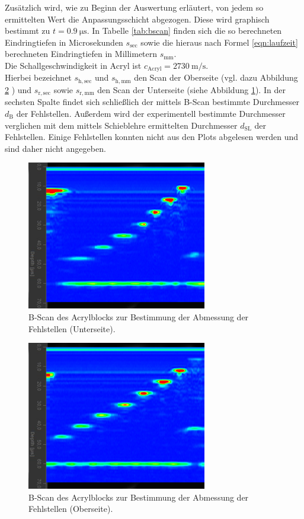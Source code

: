 Zusätzlich wird, wie zu Beginn der Auswertung erläutert, von jedem so ermittelten Wert die Anpassungsschicht abgezogen. Diese wird graphisch bestimmt zu $t=\SI{0.9}{\micro\second}$.
In Tabelle \ref{tab:bscan} finden sich die so berechneten Eindringtiefen in Microsekunden $s_\mathrm{sec}$ sowie die hieraus nach Formel \eqref{eqn:laufzeit} berechneten Eindringtiefen in Millimetern $s_\mathrm{mm}$.\\
Die Schallgeschwindigkeit in Acryl ist $c_\mathrm{Acryl}=\SI{2730}{\meter\per\second}$.\\
Hierbei bezeichnet $s_\mathrm{h,sec}$ und $s_\mathrm{h,mm}$ den Scan der Oberseite (vgl. dazu Abbildung \ref{fig:b1} ) und $s_\mathrm{r,sec}$ sowie $s_\mathrm{r,mm}$ den Scan der Unterseite (siehe Abbildung \ref{fig:b2}).
In der sechsten Spalte findet sich schließlich der mittels B-Scan bestimmte Durchmesser $d_\mathrm{B}$ der Fehlstellen. Außerdem wird der experimentell bestimmte Durchmesser verglichen mit dem mittels Schieblehre ermittelten Durchmesser $d_\mathrm{SL}$ der Fehlstellen.
Einige Fehlstellen konnten nicht aus den Plots abgelesen werden und sind daher nicht angegeben.
\begin{figure}
  \centering
  \includegraphics[width=0.7\textwidth]{bscan/bscan2rueck}
  \caption{B-Scan des Acrylblocks zur Bestimmung der Abmessung der Fehlstellen (Unterseite).}
  \label{fig:b2}
\end{figure}

\begin{figure}
  \centering
  \includegraphics[width=0.7\textwidth]{bscan/bscan2}
  \caption{B-Scan des Acrylblocks zur Bestimmung der Abmessung der Fehlstellen (Oberseite).}
  \label{fig:b1}
\end{figure}

